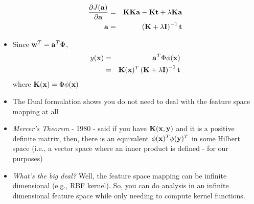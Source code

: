 \documentclass[12pt,letterpaper]{article}
\begin{document}
\begin{itemize}
\begin{eqnarray}
\frac{\partial J(\mathbf{a})}{\partial \mathbf{a}} &=& \mathbf{K}\mathbf{K}\mathbf{a} - \mathbf{K}\mathbf{t}  + \lambda\mathbf{K}\mathbf{a}\\
\mathbf{a} &=& \left(\mathbf{K} + \lambda\mathbf{I} \right)^{-1}\mathbf{t}
\end{eqnarray}
\item Since $\mathbf{w}^T = \mathbf{a}^T\Phi$, 
\begin{eqnarray}
y(\mathbf{x}) &=& \mathbf{a}^T\Phi\phi(\mathbf{x})\\
&=& \mathbf{K}(\mathbf{x})^T\left( \mathbf{K} + \lambda\mathbf{I}\right)^{-1}\mathbf{t}
\end{eqnarray}
where $\mathbf{K}(\mathbf{x}) = \Phi\phi(\mathbf{x})$
\item The Dual formulation shows you do not need to deal with the feature space mapping at all
\item \emph{Mercer's Theorem} - 1980 - said if you have $\mathbf{K}(\mathbf{x},\mathbf{y})$ and it is a positive definite matrix, then, there is an equivalent $\phi(\mathbf{x})^T\phi(\mathbf{y})^T$ in some Hilbert space (i.e., a vector space where an inner product is defined - for our purposes)
\item\emph{What's the big deal? } Well, the feature space mapping can be infinite dimensional (e.g., RBF kernel).  So, you can do analysis in an infinite dimensional feature space while only needing to compute kernel functions. 
\end{itemize}
\end{document}
